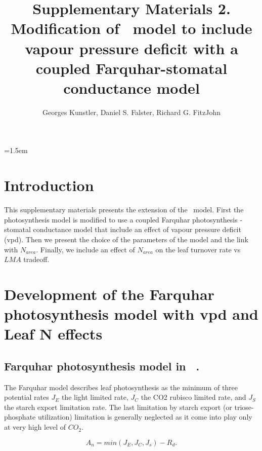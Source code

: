\documentclass[a4paper,11pt]{article}
\title{Supplementary Materials 2. Modification of \plant\ model to
  include vapour pressure deficit with a coupled Farquhar-stomatal
  conductance model}
\author{Georges Kunstler, Daniel S. Falster, Richard G. FitzJohn}
\date{}
\affiliation{INRAE LESSEM, Grenoble, France and Department of Biological Sciences, Macquarie University,
  Sydney, Australia}
\date{}
\begin{document}
\mstitleshort
\parindent=1.5em
\addtolength{\parskip}{.3em}


\section{Introduction}

This supplementary materials presents the extension of the \plant\
model. First the photosynthesis model is modified to use a coupled Farquhar
photosynthesis - stomatal conductance model that include an effect of vapour pressure deficit
(vpd). Then we present the choice of the parameters of the model and the link with
$N_{area}$. Finally,  we include an effect of $N_{area}$ on the leaf
turnover rate vs
$LMA$ tradeoff.

\section{Development of the Farquhar photosynthesis model with vpd and Leaf N effects}

\subsection{Farquhar photosynthesis model  in \plant\ .}

The Farquhar model describes leaf photosynthesis as the minimum
of three potential rates $J_E$ the light limited rate, $J_C$ the CO2
rubisco limited rate, and $J_S$ the starch export limitation rate. The
last limitation by starch export (or triose-phosphate utilization)
limitation is generally neglected as it come into play only at very
high level of $CO_2$.

\begin{equation}
\label{eq:An}
A_n= min(J_E, J_C, J_s) - R_d.
\end{equation}


\end{document}
